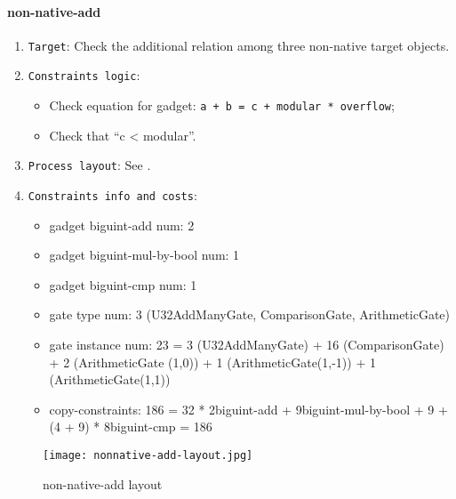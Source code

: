 \paragraph{non-native-add}

\begin{enumerate}
    \item \verb|Target|: Check the additional relation among three non-native target objects.
    \item \verb|Constraints logic|:
    \begin{itemize}
        \item Check equation for gadget: \verb|a + b = c + modular * overflow|;
        \item Check that ``c < modular''.
    \end{itemize}
    \item \verb|Process layout|: See .
    \item \verb|Constraints info and costs|:
    \begin{itemize}
        \item gadget biguint-add num: 2
        \item gadget biguint-mul-by-bool num: 1
        \item gadget biguint-cmp num: 1
        \item gate type num: 3 (U32AddManyGate, ComparisonGate, ArithmeticGate)
        \item gate instance num: 23 = 3 (U32AddManyGate) + 16 (ComparisonGate) + 2 (ArithmeticGate (1,0)) + 1 (ArithmeticGate(1,-1)) + 1 (ArithmeticGate(1,1))
        \item copy-constraints: 186 = 32 * 2{biguint-add} + 9{biguint-mul-by-bool} + 9 + (4 + 9) * 8{biguint-cmp} = 186
    \end{itemize}
\end{enumerate}

\begin{figure}[!ht]
    \centering
    \texttt{[image: nonnative-add-layout.jpg]}
    \caption{non-native-add layout}
    \label{fig:non-native-add-layout}
\end{figure}
